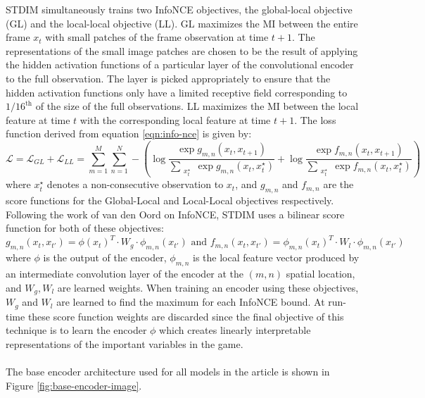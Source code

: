 STDIM simultaneously trains two InfoNCE objectives, the global-local objective (GL) and the local-local objective (LL). GL maximizes the MI between the entire frame $x_t$ with small patches of the frame observation at time $t+1$. The representations of the small image patches are chosen to be the result of applying the hidden activation functions of a particular layer of the convolutional encoder to the full observation. The layer is picked appropriately to ensure that the hidden activation functions only have a limited receptive field corresponding to $1/16^{\text{th}}$ of the size of the full observations. LL maximizes the MI between the local feature at time $t$ with the corresponding local feature at time $t+1$. The loss function derived from equation \ref{eqn:info-nce} is given by:
\begin{equation}
\mathcal{L}=\mathcal{L}_{GL}+\mathcal{L}_{LL}=\sum_{m=1}^M\sum_{n=1}^N-\left(\log{\frac{\exp{g_{m,n}(x_t,x_{t+1})}}{\sum\limits_{\substack{x_t^\star}} \exp{g_{m,n}(x_t,x_t^\star)}}}+\log{\frac{\exp{f_{m,n}(x_t,x_{t+1})}}{\sum\limits_{\substack{x_t^\star}} \exp{f_{m,n}(x_t,x_t^\star)}}}\right)
\label{eqn:loss-functions}
\end{equation}
where $x_t^\star$ denotes a non-consecutive observation to $x_t$, and $g_{m,n}$ and $f_{m,n}$ are the score functions for the Global-Local and Local-Local objectives respectively. Following the work of van den Oord \cite{infoNCE} on InfoNCE, STDIM uses a bilinear score function for both of these objectives: 
\begin{equation}
g_{m,n}(x_t, x_{t'}) = \phi(x_t)^T \cdot W_g \cdot \phi_{m,n}(x_{t'})\text{ and }  f_{m,n}(x_t, x_{t'}) = \phi_{m,n}(x_t)^T\cdot W_l\cdot \phi_{m,n}(x_{t'})
\label{eqn:bilinear}
\end{equation}
where $\phi$ is the output of the encoder, $\phi_{m,n}$ is the local feature vector produced by an intermediate convolution layer of the encoder at the $(m,n)$ spatial location, and $W_g,W_l$ are learned weights. When training an encoder using these objectives, $W_g$ and $W_l$ are learned to find the maximum for each InfoNCE bound. At run-time these score function weights are discarded since the final objective of this technique is to learn the encoder $\phi$ which creates linearly interpretable representations of the important variables in the game.
\\\\
The base encoder architecture used for all models in the article is shown in Figure \ref{fig:base-encoder-image}.
